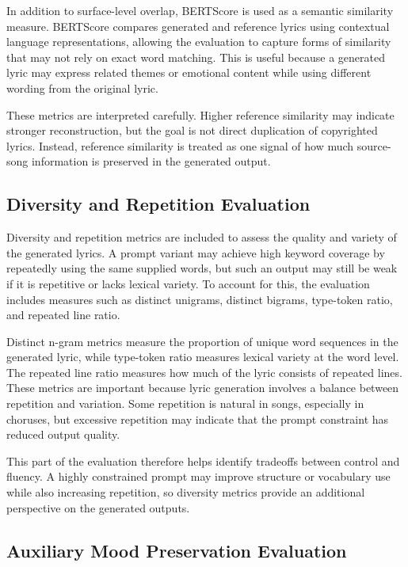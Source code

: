 In addition to surface-level overlap, BERTScore is used as a semantic similarity measure. BERTScore compares generated and reference lyrics using contextual language representations, allowing the evaluation to capture forms of similarity that may not rely on exact word matching. This is useful because a generated lyric may express related themes or emotional content while using different wording from the original lyric.

These metrics are interpreted carefully. Higher reference similarity may indicate stronger reconstruction, but the goal is not direct duplication of copyrighted lyrics. Instead, reference similarity is treated as one signal of how much source-song information is preserved in the generated output.

\subsection{Diversity and Repetition Evaluation}

Diversity and repetition metrics are included to assess the quality and variety of the generated lyrics. A prompt variant may achieve high keyword coverage by repeatedly using the same supplied words, but such an output may still be weak if it is repetitive or lacks lexical variety. To account for this, the evaluation includes measures such as distinct unigrams, distinct bigrams, type-token ratio, and repeated line ratio.

Distinct n-gram metrics measure the proportion of unique word sequences in the generated lyric, while type-token ratio measures lexical variety at the word level. The repeated line ratio measures how much of the lyric consists of repeated lines. These metrics are important because lyric generation involves a balance between repetition and variation. Some repetition is natural in songs, especially in choruses, but excessive repetition may indicate that the prompt constraint has reduced output quality.

This part of the evaluation therefore helps identify tradeoffs between control and fluency. A highly constrained prompt may improve structure or vocabulary use while also increasing repetition, so diversity metrics provide an additional perspective on the generated outputs.

\subsection{Auxiliary Mood Preservation Evaluation}

